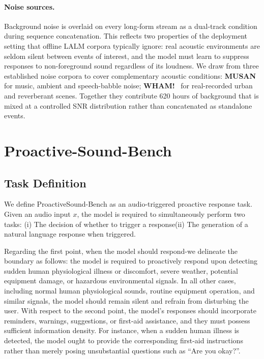\documentclass{llmxive}
\begin{document}
\paragraph{Noise sources.}
Background noise is overlaid on every long-form stream as a dual-track condition during
sequence concatenation. This reflects two
properties of the deployment setting that offline LALM corpora typically ignore: real
acoustic environments are seldom silent between events of interest, and the model must
learn to suppress responses to non-foreground sound regardless of its loudness. We draw
from three established noise corpora to cover complementary acoustic conditions:
\textbf{MUSAN}~\citep{snyder2015musan} for music, ambient and speech-babble noise;
\textbf{WHAM!}~\citep{wichern2019wham} for real-recorded urban and reverberant scenes. Together they
contribute 620 hours of background that is mixed at a controlled SNR distribution rather
than concatenated as standalone events.





\section{Proactive-Sound-Bench}
\label{app:bench}

\subsection{Task Definition}
\label{app:bench:task}
We define ProactiveSound-Bench as an audio-triggered proactive response task. Given an audio input $x$, the model is required to simultaneously perform two tasks: (i) The decision of whether to trigger a response(ii) The generation of a natural language response when triggered.

Regarding the first point, when the model should respond-we delineate the boundary as follows: the model is required to proactively respond upon detecting sudden human physiological illness or discomfort, severe weather, potential equipment damage, or hazardous environmental signals. In all other cases, including normal human physiological sounds, routine equipment operation, and similar signals, the model should remain silent and refrain from disturbing the user.  
With respect to the second point, the model’s responses should incorporate reminders, warnings, suggestions, or first-aid assistance, and they must possess sufficient information density. For instance, when a sudden human illness is detected, the model ought to provide the corresponding first-aid instructions rather than merely posing unsubstantial questions such as “Are you okay?”.
\end{document}
